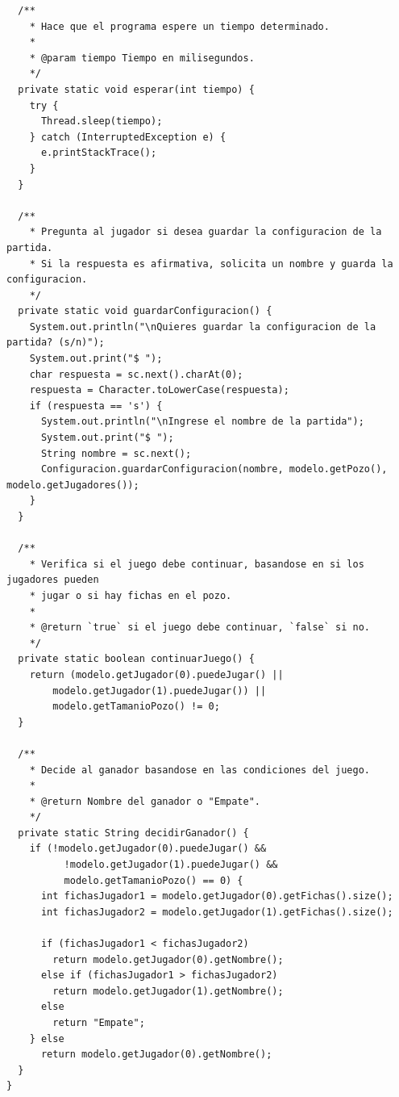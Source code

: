 \documentclass[12pt]{article}
\begin{document}
\begin{lstlisting}
  /**
    * Hace que el programa espere un tiempo determinado.
    * 
    * @param tiempo Tiempo en milisegundos.
    */
  private static void esperar(int tiempo) {
    try {
      Thread.sleep(tiempo);
    } catch (InterruptedException e) {
      e.printStackTrace();
    }
  }

  /**
    * Pregunta al jugador si desea guardar la configuracion de la partida.
    * Si la respuesta es afirmativa, solicita un nombre y guarda la configuracion.
    */
  private static void guardarConfiguracion() {
    System.out.println("\nQuieres guardar la configuracion de la partida? (s/n)");
    System.out.print("$ ");
    char respuesta = sc.next().charAt(0);
    respuesta = Character.toLowerCase(respuesta);
    if (respuesta == 's') {
      System.out.println("\nIngrese el nombre de la partida");
      System.out.print("$ ");
      String nombre = sc.next();
      Configuracion.guardarConfiguracion(nombre, modelo.getPozo(), modelo.getJugadores());
    }
  }

  /**
    * Verifica si el juego debe continuar, basandose en si los jugadores pueden
    * jugar o si hay fichas en el pozo.
    * 
    * @return `true` si el juego debe continuar, `false` si no.
    */
  private static boolean continuarJuego() {
    return (modelo.getJugador(0).puedeJugar() ||
        modelo.getJugador(1).puedeJugar()) ||
        modelo.getTamanioPozo() != 0;
  }

  /**
    * Decide al ganador basandose en las condiciones del juego.
    * 
    * @return Nombre del ganador o "Empate".
    */
  private static String decidirGanador() {
    if (!modelo.getJugador(0).puedeJugar() &&
          !modelo.getJugador(1).puedeJugar() &&
          modelo.getTamanioPozo() == 0) {
      int fichasJugador1 = modelo.getJugador(0).getFichas().size();
      int fichasJugador2 = modelo.getJugador(1).getFichas().size();

      if (fichasJugador1 < fichasJugador2)
        return modelo.getJugador(0).getNombre();
      else if (fichasJugador1 > fichasJugador2)
        return modelo.getJugador(1).getNombre();
      else
        return "Empate";
    } else
      return modelo.getJugador(0).getNombre();
  }
}
  \end{lstlisting}
\end{document}
